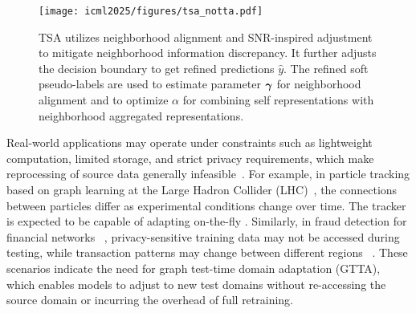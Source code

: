 \begin{figure*}[t]
\centering

\texttt{[image: icml2025/figures/tsa\_notta.pdf]}
\vspace{-2mm}
\caption{TSA utilizes neighborhood alignment and SNR-inspired adjustment to mitigate neighborhood information discrepancy. It further adjusts the decision boundary to get refined predictions $\hat{y}$. The refined soft pseudo-labels are used to estimate parameter $\boldsymbol{\gamma}$ for neighborhood alignment and to optimize $\alpha$ for combining self representations with neighborhood aggregated representations. %
}
\label{fig:tsa}
\vspace{-2mm}
\end{figure*}

Real-world applications may operate under constraints such as lightweight computation, limited storage, and strict privacy requirements, which make reprocessing of source data generally infeasible~\cite{wang2021gnnadvisor, wu2021fedgnn}.
For example, in particle tracking based on graph learning at the Large Hadron Collider (LHC)~\cite{shlomi2020graph, highfield2008large,miao2024locality}, the connections between particles differ as experimental conditions change over time. The tracker is expected to be capable of adapting on-the-fly 
\cite{li2023semi, komiske2017pileup}.
Similarly, in fraud detection for financial networks~ \cite{clements2020sequential, wang2021review}, privacy-sensitive training data may not be accessed during testing, while transaction patterns may change between different regions
~\cite{wang2019semi, dou2020enhancing}.
These scenarios indicate the need for graph test-time domain adaptation (GTTA), which enables models to adjust to new test domains without re-accessing the source domain or incurring the overhead of full retraining.

